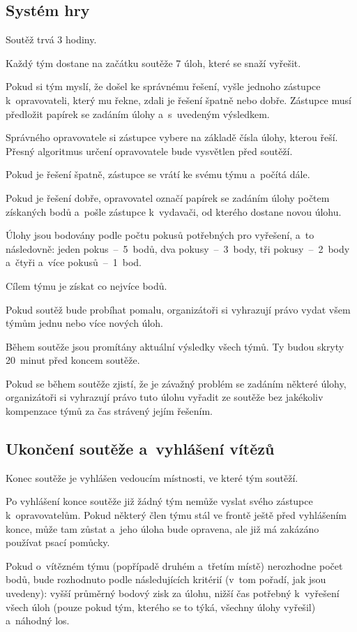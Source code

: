 \documentclass[fykos,\classoptions]{fksgeneric}
\begin{document}
\subsection*{Systém hry}
\begin{compactitem}
	\item Soutěž trvá 3 hodiny.
	\item Každý tým dostane na začátku soutěže 7 úloh, které se snaží vyřešit.
	\item Pokud si tým myslí, že došel ke správnému řešení, vyšle jednoho zástupce
	k~opravovateli, který mu řekne, zdali je řešení špatně nebo dobře. Zástupce
	musí předložit papírek se zadáním úlohy a~s~uvedeným výsledkem.
	\item Správného opravovatele si zástupce vybere na základě čísla úlohy, kterou
	řeší. Přesný algoritmus určení opravovatele bude vysvětlen před soutěží.
	\item Pokud je řešení špatně, zástupce se vrátí ke svému týmu a~počítá dále.
	\item Pokud je řešení dobře, opravovatel označí papírek se zadáním úlohy počtem
	získaných bodů a~pošle zástupce k~vydavači, od kterého dostane novou úlohu.
	\item Úlohy jsou bodovány podle počtu pokusů potřebných pro vyřešení, a~to
	následovně: jeden pokus~--~5~bodů, dva pokusy~--~3~body, tři
	pokusy~--~2~body a~čtyři a~více pokusů~--~1~bod.
	\item Cílem týmu je získat co nejvíce bodů.
	\item Pokud soutěž bude probíhat pomalu, organizátoři si vyhrazují právo vydat
	všem týmům jednu nebo více nových úloh.
	\item Během soutěže jsou promítány aktuální výsledky všech týmů. Ty budou
	skryty 20~minut před koncem soutěže.
	\item Pokud se během soutěže zjistí, že je závažný problém se zadáním některé
	úlohy, organizátoři si vyhrazují právo tuto úlohu vyřadit ze soutěže bez
	jakékoliv kompenzace týmů za čas strávený jejím řešením.
\end{compactitem}

\subsection*{Ukončení soutěže a~vyhlášení vítězů}
\begin{compactitem}
	\item Konec soutěže je vyhlášen vedoucím místnosti, ve které tým soutěží.
	\item Po vyhlášení konce soutěže již žádný tým nemůže vyslat svého zástupce
	k~opravovatelům. Pokud některý člen týmu stál ve frontě ještě před vyhlášením
	konce, může tam zůstat a~jeho úloha bude opravena, ale již má zakázáno používat
	psací pomůcky.
	\item Pokud o~vítězném týmu (popřípadě druhém a~třetím místě) nerozhodne počet
	bodů, bude rozhodnuto podle následujících kritérií (v~tom pořadí, jak jsou
	uvedeny): vyšší průměrný bodový zisk za úlohu, nižší čas potřebný k~vyřešení
	všech úloh (pouze pokud tým, kterého se to týká, všechny úlohy vyřešil)
	a~náhodný los.
\end{compactitem}
\end{document}
